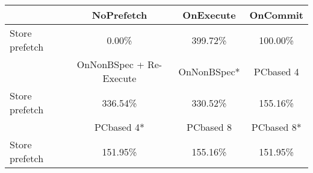 \begin{tabular}{ l|ccc }
 & NoPrefetch & OnExecute & OnCommit\\ \hline
Store prefetch & 0.00\% & 399.72\% & 100.00\%\\ \hline
\hline
 & OnNonBSpec + Re-Execute & OnNonBSpec* & PCbased 4\\ \hline
Store prefetch & 336.54\% & 330.52\% & 155.16\%\\ \hline
\hline
 & PCbased 4* & PCbased 8 & PCbased 8*\\ \hline
Store prefetch & 151.95\% & 155.16\% & 151.95\%\\ \hline
\end{tabular}

